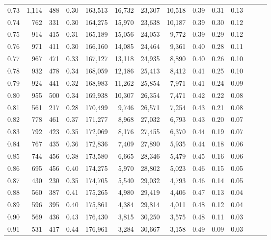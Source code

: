 \begin{tabular}{rrrrrrrrrrrrrr}
0.73 &  1,114 &  488 &  0.30 &  163,513 &   16,732 &  23,307 &  10,518 &  0.39 &  0.31 &      0.13 \\
0.74 &    762 &  331 &  0.30 &  164,275 &   15,970 &  23,638 &  10,187 &  0.39 &  0.30 &      0.12 \\
0.75 &    914 &  415 &  0.31 &  165,189 &   15,056 &  24,053 &   9,772 &  0.39 &  0.29 &      0.12 \\
0.76 &    971 &  411 &  0.30 &  166,160 &   14,085 &  24,464 &   9,361 &  0.40 &  0.28 &      0.11 \\
0.77 &    967 &  471 &  0.33 &  167,127 &   13,118 &  24,935 &   8,890 &  0.40 &  0.26 &      0.10 \\
0.78 &    932 &  478 &  0.34 &  168,059 &   12,186 &  25,413 &   8,412 &  0.41 &  0.25 &      0.10 \\
0.79 &    924 &  441 &  0.32 &  168,983 &   11,262 &  25,854 &   7,971 &  0.41 &  0.24 &      0.09 \\
0.80 &    955 &  500 &  0.34 &  169,938 &   10,307 &  26,354 &   7,471 &  0.42 &  0.22 &      0.08 \\
0.81 &    561 &  217 &  0.28 &  170,499 &    9,746 &  26,571 &   7,254 &  0.43 &  0.21 &      0.08 \\
0.82 &    778 &  461 &  0.37 &  171,277 &    8,968 &  27,032 &   6,793 &  0.43 &  0.20 &      0.07 \\
0.83 &    792 &  423 &  0.35 &  172,069 &    8,176 &  27,455 &   6,370 &  0.44 &  0.19 &      0.07 \\
0.84 &    767 &  435 &  0.36 &  172,836 &    7,409 &  27,890 &   5,935 &  0.44 &  0.18 &      0.06 \\
0.85 &    744 &  456 &  0.38 &  173,580 &    6,665 &  28,346 &   5,479 &  0.45 &  0.16 &      0.06 \\
0.86 &    695 &  456 &  0.40 &  174,275 &    5,970 &  28,802 &   5,023 &  0.46 &  0.15 &      0.05 \\
0.87 &    430 &  230 &  0.35 &  174,705 &    5,540 &  29,032 &   4,793 &  0.46 &  0.14 &      0.05 \\
0.88 &    560 &  387 &  0.41 &  175,265 &    4,980 &  29,419 &   4,406 &  0.47 &  0.13 &      0.04 \\
0.89 &    596 &  395 &  0.40 &  175,861 &    4,384 &  29,814 &   4,011 &  0.48 &  0.12 &      0.04 \\
0.90 &    569 &  436 &  0.43 &  176,430 &    3,815 &  30,250 &   3,575 &  0.48 &  0.11 &      0.03 \\
0.91 &    531 &  417 &  0.44 &  176,961 &    3,284 &  30,667 &   3,158 &  0.49 &  0.09 &      0.03 \\

\end{tabular}

